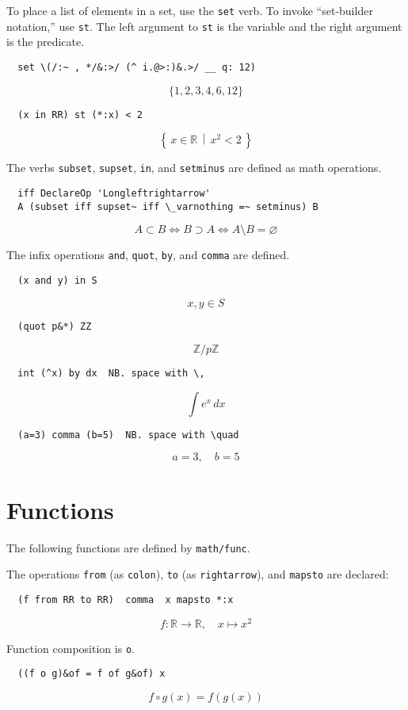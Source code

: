 \documentclass{article}
\begin{document}
To place a list of elements in a set, use the \lstinline`set` verb. To invoke
``set-builder notation,'' use \lstinline`st`. The left argument to \lstinline`st` is the
variable and the right argument is the predicate.
\begin{lstlisting}
  set \(/:~ , */&:>/ (^ i.@>:)&.>/ __ q: 12)
\end{lstlisting}
\[\{1,2,3,4,6,12\}\]
\begin{lstlisting}
  (x in RR) st (*:x) < 2
\end{lstlisting}
\[\left\{\,x \in \mathbb{R}\,\middle|\,x^2<2\,\right\}\]

The verbs \lstinline`subset`, \lstinline`supset`, \lstinline`in`, and \lstinline`setminus` are defined as
math operations.
\begin{lstlisting}
  iff DeclareOp 'Longleftrightarrow'
  A (subset iff supset~ iff \_varnothing =~ setminus) B
\end{lstlisting}
\[A \subset B \Longleftrightarrow B \supset A \Longleftrightarrow A \setminus B=\varnothing\]

The infix operations \lstinline`and`, \lstinline`quot`, \lstinline`by`, and \lstinline`comma` are defined.
\begin{lstlisting}
  (x and y) in S
\end{lstlisting}
\[x,y \in S\]
\begin{lstlisting}
  (quot p&*) ZZ
\end{lstlisting}
\[\mathbb{Z}/p \mathbb{Z}\]
\begin{lstlisting}
  int (^x) by dx  NB. space with \,
\end{lstlisting}
\[\int e^{x}\,dx\]
\begin{lstlisting}
  (a=3) comma (b=5)  NB. space with \quad
\end{lstlisting}
\[a=3,\quad b=5\]

\section{Functions}
The following functions are defined by \lstinline`math/func`.

The operations \lstinline`from` (as \lstinline`colon`), \lstinline`to` (as \lstinline`rightarrow`), and
\lstinline`mapsto` are declared:
\begin{lstlisting}
  (f from RR to RR)  comma  x mapsto *:x
\end{lstlisting}
\[f \colon \mathbb{R} \rightarrow \mathbb{R},\quad x \mapsto x^2\]

Function composition is \lstinline`o`.
\begin{lstlisting}
  ((f o g)&of = f of g&of) x
\end{lstlisting}
\[f \circ g(x)=f(g(x))\]
\end{document}
